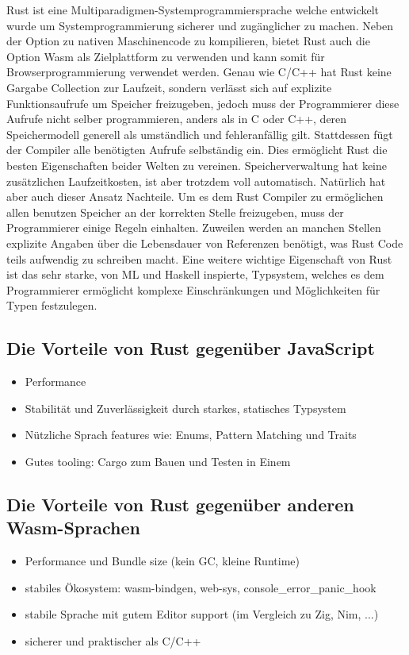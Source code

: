 Rust ist eine Multiparadigmen-Systemprogrammiersprache welche entwickelt wurde um Systemprogrammierung sicherer und zugänglicher zu machen. Neben der Option zu nativen Maschinencode zu kompilieren, bietet Rust auch die Option Wasm als Zielplattform zu verwenden und kann somit für Browserprogrammierung verwendet werden.
Genau wie C/C++ hat Rust keine Gargabe Collection zur Laufzeit, sondern verlässt sich auf explizite Funktionsaufrufe um Speicher freizugeben, jedoch muss der Programmierer diese Aufrufe nicht selber programmieren, anders als in C oder C++, deren Speichermodell generell als umständlich und fehleranfällig gilt.
Stattdessen fügt der Compiler alle benötigten Aufrufe selbständig ein. Dies ermöglicht Rust die besten Eigenschaften beider Welten zu vereinen. Speicherverwaltung hat keine zusätzlichen Laufzeitkosten, ist aber trotzdem voll automatisch.
Natürlich hat aber auch dieser Ansatz Nachteile. Um es dem Rust Compiler zu ermöglichen allen benutzen Speicher an der korrekten Stelle freizugeben, muss der Programmierer einige Regeln einhalten. Zuweilen werden an manchen Stellen explizite Angaben über die Lebensdauer von Referenzen benötigt, was Rust Code teils aufwendig zu schreiben macht.
Eine weitere wichtige Eigenschaft von Rust ist das sehr starke, von ML und Haskell inspierte, Typsystem, welches es dem Programmierer ermöglicht komplexe Einschränkungen und Möglichkeiten für Typen festzulegen.

\subsection{Die Vorteile von Rust gegenüber JavaScript}

\begin{itemize}
  \item Performance
  \item Stabilität und Zuverlässigkeit durch starkes, statisches Typsystem
  \item Nützliche Sprach features wie: Enums, Pattern Matching und Traits
  \item Gutes tooling: Cargo zum Bauen und Testen in Einem
\end{itemize}

\subsection{Die Vorteile von Rust gegenüber anderen Wasm-Sprachen}

\begin{itemize}
  \item Performance und Bundle size (kein GC, kleine Runtime)
  \item stabiles Ökosystem: wasm-bindgen, web-sys, console\_error\_panic\_hook
  \item stabile Sprache mit gutem Editor support (im Vergleich zu Zig, Nim, ...)
  \item sicherer und praktischer als C/C++
\end{itemize}

